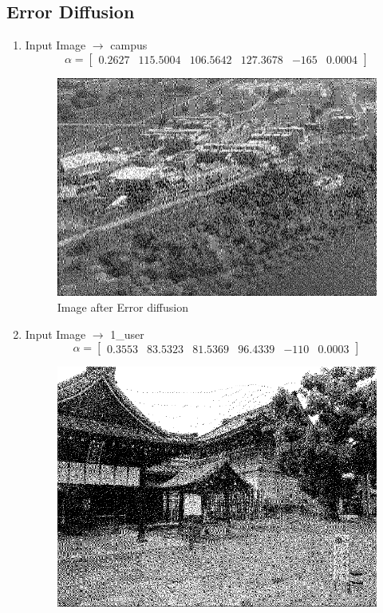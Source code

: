 \documentclass{article}
\begin{document}
    \subsection{Error Diffusion}
    \begin{enumerate}
    \item Input Image $\longrightarrow$ campus
    \[
    \alpha=
    \begin{bmatrix} 
      0.2627 & 115.5004 &	106.5642 &	127.3678 &	-165 &	0.0004
    \end{bmatrix}
    \]
    \begin{figure}[H]
        \centering
        \includegraphics[width=0.75\linewidth]{41.png}
        \caption{Image after Error diffusion}
        \label{fig:Image after Error diffusion}
    \end{figure}
    \item Input Image $\longrightarrow$ 1{\_}user
    \[
    \alpha=
    \begin{bmatrix} 
     0.3553 &	83.5323 &	81.5369 &	96.4339 &	-110 &	0.0003
    \end{bmatrix}
    \]
    \begin{figure}[H]
        \centering
        \includegraphics[width=0.75\linewidth]{42.png}

\end{figure}
\end{enumerate}
\end{document}
